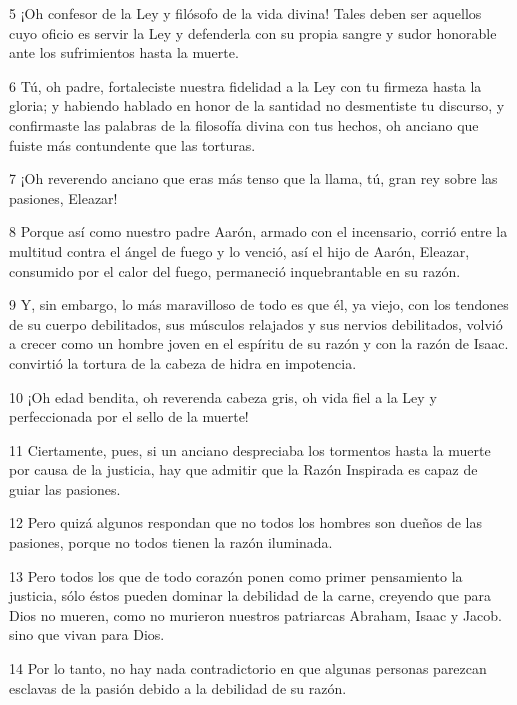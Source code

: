 \par 5 ¡Oh confesor de la Ley y filósofo de la vida divina! Tales deben ser aquellos cuyo oficio es servir la Ley y defenderla con su propia sangre y sudor honorable ante los sufrimientos hasta la muerte.

\par 6 Tú, oh padre, fortaleciste nuestra fidelidad a la Ley con tu firmeza hasta la gloria; y habiendo hablado en honor de la santidad no desmentiste tu discurso, y confirmaste las palabras de la filosofía divina con tus hechos, oh anciano que fuiste más contundente que las torturas.

\par 7 ¡Oh reverendo anciano que eras más tenso que la llama, tú, gran rey sobre las pasiones, Eleazar!

\par 8 Porque así como nuestro padre Aarón, armado con el incensario, corrió entre la multitud contra el ángel de fuego y lo venció, así el hijo de Aarón, Eleazar, consumido por el calor del fuego, permaneció inquebrantable en su razón.

\par 9 Y, sin embargo, lo más maravilloso de todo es que él, ya viejo, con los tendones de su cuerpo debilitados, sus músculos relajados y sus nervios debilitados, volvió a crecer como un hombre joven en el espíritu de su razón y con la razón de Isaac. convirtió la tortura de la cabeza de hidra en impotencia.

\par 10 ¡Oh edad bendita, oh reverenda cabeza gris, oh vida fiel a la Ley y perfeccionada por el sello de la muerte!

\par 11 Ciertamente, pues, si un anciano despreciaba los tormentos hasta la muerte por causa de la justicia, hay que admitir que la Razón Inspirada es capaz de guiar las pasiones.

\par 12 Pero quizá algunos respondan que no todos los hombres son dueños de las pasiones, porque no todos tienen la razón iluminada.

\par 13 Pero todos los que de todo corazón ponen como primer pensamiento la justicia, sólo éstos pueden dominar la debilidad de la carne, creyendo que para Dios no mueren, como no murieron nuestros patriarcas Abraham, Isaac y Jacob. sino que vivan para Dios.

\par 14 Por lo tanto, no hay nada contradictorio en que algunas personas parezcan esclavas de la pasión debido a la debilidad de su razón.

